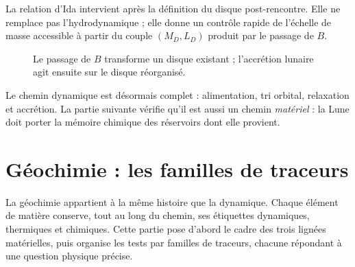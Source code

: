 \documentclass[11pt,a4paper,openany]{report}
\begin{document}
\begin{lecture}
La relation d'Ida intervient après la définition du disque post-rencontre. Elle ne remplace pas
l'hydrodynamique ; elle donne un contrôle rapide de l'échelle de masse accessible à partir du
couple $(M_D,L_D)$ produit par le passage de $B$.
\end{lecture}

\begin{figure}[htbp]
\centering
{}
\caption{Le passage de $B$ transforme un disque existant ; l'accrétion lunaire agit ensuite sur le
disque réorganisé.}
\label{fig:flux}
\end{figure}


\begin{rappel}
Le chemin dynamique est désormais complet : alimentation, tri orbital, relaxation et accrétion. La
partie suivante vérifie qu'il est aussi un chemin \emph{matériel} : la Lune doit porter la mémoire
chimique des réservoirs dont elle provient.
\end{rappel}

\part{Géochimie : les familles de traceurs}
\label{part:geochimie}

\noindent
La géochimie appartient à la même histoire que la dynamique. Chaque élément de matière
conserve, tout au long du chemin, ses étiquettes dynamiques, thermiques et chimiques. Cette
partie pose d'abord le cadre des trois lignées matérielles, puis organise les tests par familles de
traceurs, chacune répondant à une question physique précise.
\end{document}
